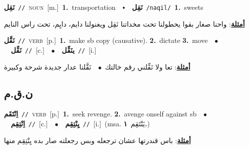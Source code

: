 \documentclass[10pt,a4paper,twoside]{article} %
\begin{document}
\begin{multicols}{2}
{\setlength\topsep{0pt}\textbf{\foreignlanguage{arabic}{نَقِل}}\ {\color{gray}\texttt{//}\color{black}}\ \textsc{noun}\ [m.]\ \textbf{1.}~transportation\ \ $\smblkdiamond$\ \ \setlength\topsep{0pt}\textbf{\foreignlanguage{arabic}{نَقِل}}\ {\color{gray}\texttt{/naqil/}\color{black}}\ \textbf{1.}~sweets\  \begin{flushright}\color{gray}\foreignlanguage{arabic}{\textbf{\underline{\foreignlanguage{arabic}{أمثلة}}}: واحنا صغار بقوا يحطولنا تحت مخداتنا نَقِل ويغنولنا دايم، دايِم، تحت راس النايم}\end{flushright}\color{black}} \vspace{2mm}

{\setlength\topsep{0pt}\textbf{\foreignlanguage{arabic}{نَقَّل}}\ {\color{gray}\texttt{//}\color{black}}\ \textsc{verb}\ [p.]\ \textbf{1.}~make sb copy (causative).  \textbf{2.}~dictate  \textbf{3.}~move\ \ $\bullet$\ \ \setlength\topsep{0pt}\textbf{\foreignlanguage{arabic}{نَقِّل}}\ {\color{gray}\texttt{//}\color{black}}\ [c.]\ \ $\bullet$\ \ \setlength\topsep{0pt}\textbf{\foreignlanguage{arabic}{ينَقِّل}}\ {\color{gray}\texttt{//}\color{black}}\ [i.]\  \begin{flushright}\color{gray}\foreignlanguage{arabic}{\textbf{\underline{\foreignlanguage{arabic}{أمثلة}}}: تعا ولا نَقِّلني رقم خالتك\ $\bullet$\ \  نَقَّلنا عدار جديدة شرحة وكبيرة}\end{flushright}\color{black}} \vspace{2mm}

\vspace{-3mm}
\subsection*{\color{blue}\foreignlanguage{arabic}{ن.ق.م}\color{blue}{}} 

{\setlength\topsep{0pt}\textbf{\foreignlanguage{arabic}{اِنْتَقَم}}\ {\color{gray}\texttt{//}\color{black}}\ \textsc{verb}\ [p.]\ \textbf{1.}~seek revenge.  \textbf{2.}~avenge onself against sb\ \ $\bullet$\ \ \setlength\topsep{0pt}\textbf{\foreignlanguage{arabic}{اِنْتِقِم}}\ {\color{gray}\texttt{//}\color{black}}\ [c.]\ \ $\bullet$\ \ \setlength\topsep{0pt}\textbf{\foreignlanguage{arabic}{يِنْتِقِم}}\ {\color{gray}\texttt{//}\color{black}}\ [i.]\ \color{gray}(msa. \foreignlanguage{arabic}{يَنْتَقِم}~\foreignlanguage{arabic}{\textbf{١.}})\color{black}\  \begin{flushright}\color{gray}\foreignlanguage{arabic}{\textbf{\underline{\foreignlanguage{arabic}{أمثلة}}}: باس قندرتها عشان ترجعله وبس رجعلته صار بده يِنْتِقِم منها}\end{flushright}\color{black}} \vspace{2mm}


\end{multicols}
\end{document}

